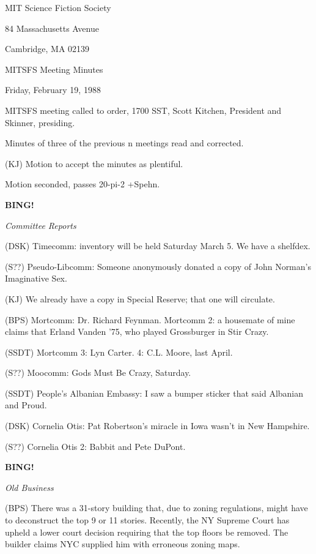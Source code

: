 \documentclass[12pt]{article}
\newcommand{\bing}{{\bf BING!} }
\newcommand{\goto}[1]{\bing \vskip 12pt \centerline{{\em{#1}}}}
\begin{document}
\begin{center}

MIT Science Fiction Society 

84 Massachusetts Avenue

Cambridge, MA 02139

\vspace{12pt}

MITSFS Meeting Minutes 

Friday, February 19, 1988

\end{center}
 
\vspace{18pt}

\setlength{\parskip}{6pt}

\noindent
MITSFS meeting called to order, 1700 SST,
Scott Kitchen, President and Skinner, presiding.

Minutes of three of the previous n meetings read and corrected.

(KJ) Motion to accept the minutes as plentiful.

Motion seconded, passes 20-pi-2 +Spehn.

\goto{Committee Reports}

(DSK) Timecomm: inventory will be held Saturday March 5. We have a shelfdex.

(S??) Pseudo-Libcomm: Someone anonymously donated a copy of John Norman's Imaginative Sex.

(KJ) We already have a copy in Special Reserve; that one will circulate.

(BPS) Mortcomm: Dr. Richard Feynman. Mortcomm 2: a housemate of mine claims that Erland Vanden '75, who played Grossburger in Stir Crazy.

(SSDT) Mortcomm 3: Lyn Carter. 4: C.L. Moore, last April.

(S??) Moocomm: Gods Must Be Crazy, Saturday.

(SSDT) People's Albanian Embassy: I saw a bumper sticker that said Albanian and Proud.

(DSK) Cornelia Otis: Pat Robertson's miracle in Iowa wasn't in New Hampshire.

(S??) Cornelia Otis 2: Babbit and Pete DuPont.

\goto{Old Business}

(BPS) There was a 31-story building that, due to zoning regulations, might have to deconstruct the top 9 or 11 stories. Recently, the NY Supreme Court has upheld a lower court decision requiring that the top floors be removed. The builder claims NYC supplied him with erroneous zoning maps.
\end{document}
